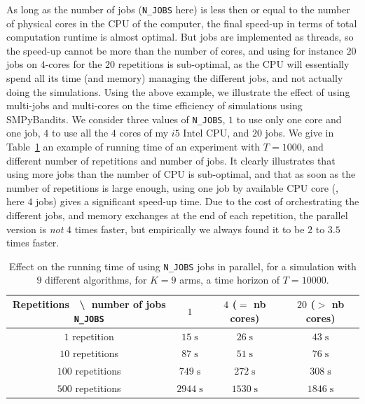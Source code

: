 As long as the number of jobs (\texttt{N\_JOBS} here) is less then or equal to the number of physical cores in the CPU of the computer, the final speed-up in terms of total computation runtime is almost optimal.
But jobs are implemented as threads, so the speed-up cannot be more than the number of cores, and using for instance $20$ jobs on $4$-cores for the $20$ repetitions is sub-optimal, as the CPU will essentially spend all its time (and memory) managing the different jobs, and not actually doing the simulations.
Using the above example, we illustrate the effect of using multi-jobs and multi-cores on the time efficiency of simulations using SMPyBandits. We consider three values of \texttt{N\_JOBS}, $1$ to use only one core and one job, $4$ to use all the $4$ cores of my $i5$ Intel CPU, and $20$ jobs.
We give in Table~\ref{table:3:speedUpTimeParallelComputations} an example of running time of an experiment with $T=1000$, and different number of repetitions and number of jobs.
It clearly illustrates that using more jobs than the number of CPU is sub-optimal, and that as soon as the number of repetitions is large enough, using one job by available CPU core (\ie, here $4$ jobs) gives a significant speed-up time.
Due to the cost of orchestrating the different jobs, and memory exchanges at the end of each repetition, the parallel version is \emph{not} $4$ times faster, but empirically we always found it to be $2$ to $3.5$ times faster.


\begin{table}[ht]
    \centering
    \begin{tabular}{c|ccc}
    \textbf{Repetitions} $\;$ \textbackslash $\;$ number of jobs \texttt{N\_JOBS} & $1$ & $4$ ($=$ nb cores) & $20$ ($>$ nb cores) \\
        \hline
        $1$ repetition    & $15 \;\text{s}$ & $26 \;\text{s}$ & $43 \;\text{s}$ \\
        $10$ repetitions  & $87 \;\text{s}$ & $51 \;\text{s}$ & $76 \;\text{s}$ \\
        $100$ repetitions & $749 \;\text{s}$ & $272 \;\text{s}$ & $308 \;\text{s}$ \\
        $500$ repetitions & $2944 \;\text{s}$ & $1530 \;\text{s}$ & $1846 \;\text{s}$ \\
    \end{tabular}
    \caption{Effect on the running time of using \texttt{N\_JOBS} jobs in parallel, for a simulation with $9$ different algorithms, for $K=9$ arms, a time horizon of $T=10000$.}
    \label{table:3:speedUpTimeParallelComputations}
\end{table}


